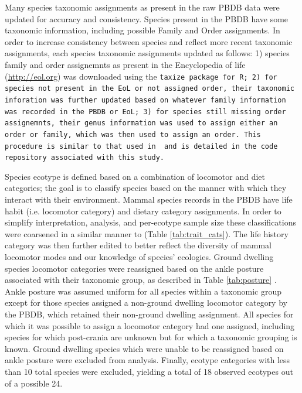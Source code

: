 \documentclass[12pt,letterpaper]{article}
\begin{document}
Many species taxonomic assignments as present in the raw PBDB data were updated for accuracy and consistency. Species present in the PBDB have some taxonomic information, including possible Family and Order assignments. In order to increase consistency between species and reflect more recent taxonomic assignments, each species taxonomic assignments updated as follows: 1) species family and order assignemnts as present in the Encyclopedia of life (\url{http://eol.org}) was downloaded using the \tt{taxize} package for R; 2) for species not present in the EoL or not assigned order, their taxonomic inforation was further updated based on whatever family information was recorded in the PBDB or EoL; 3) for species still missing order assignemnts, their genus information was used to assign either an order or family, which was then used to assign an order. This procedure is similar to that used in \citet{Smits2015b} and is detailed in the code repository associated with this study.
%  


Species ecotype is defined based on a combination of locomotor and diet categories; the goal is to classify species based on the manner with which they interact with their environment. Mammal species records in the PBDB have life habit (i.e. locomotor category) and dietary category assignments. In order to simplify interpretation, analysis, and per-ecotype sample size these classifications were coarsened in a similar manner to \citet{Smits2015b} (Table \ref{tab:trait_cats}). The life history category was then further edited to better reflect the diversity of mammal locomotor modes and our knowledge of species' ecologies. Ground dwelling species locomotor categories were reassigned based on the ankle posture associated with their taxonomic group, as described in Table \ref{tab:posture} \citep{Carrano1999}. Ankle posture was assumed uniform for all species within a taxonomic group except for those species assigned a non-ground dwelling locomotor category by the PBDB, which retained their non-ground dwelling assignment. All species for which it was possible to assign a locomotor category had one assigned, including species for which post-crania are unknown but for which a taxonomic grouping is known. Ground dwelling species which were unable to be reassigned based on ankle posture were excluded from analysis. Finally, ecotype categories with less than 10 total species were excluded, yielding a total of 18 observed ecotypes out of a possible 24.
\end{document}

